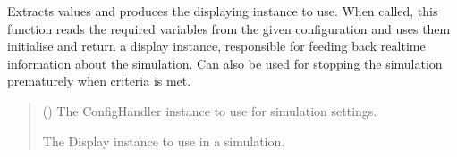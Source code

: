 \documentclass[letterpaper,10pt,english]{sphinxmanual}
\begin{document}
\begin{fulllineitems}
\label{\detokenize{modules/input/config:qnav.input.config.get_displayer}}
\pysigstartsignatures
{}
\pysigstopsignatures
\sphinxAtStartPar
Extracts values and produces the displaying instance to use.
When called, this function reads the required variables from the
given configuration and uses them initialise and return a display
instance, responsible for feeding back real\sphinxhyphen{}time information about
the simulation. Can also be used for stopping the simulation
prematurely when criteria is met.
\begin{quote}\begin{description}
\sphinxAtStartPar
{} ({\hyperref[\detokenize{modules/input/config_handler:qnav.input.config_handler.ConfigHandler}]{}}) \textendash{} The ConfigHandler instance to use for simulation settings.

\sphinxAtStartPar
The Display instance to use in a simulation.

\sphinxAtStartPar
{\hyperref[\detokenize{modules/simulation/display:qnav.simulation.display.Display}]{}}

\end{description}\end{quote}

\end{fulllineitems}

\end{document}
